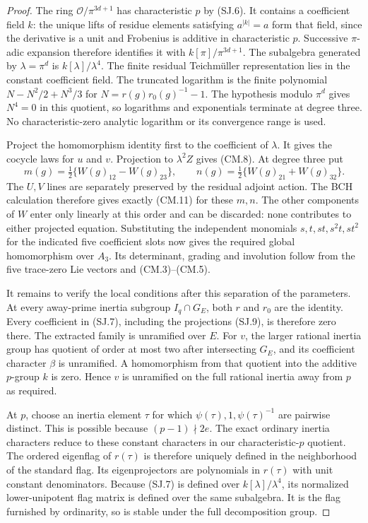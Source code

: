 \begin{proof}
The ring $\mathcal O/\pi^{3d+1}$ has characteristic $p$
by (SJ.6).  It contains a coefficient field $k$: the unique
lifts of residue elements satisfying $a^{|k|}=a$ form that
field, since the derivative is a unit and Frobenius is
additive in characteristic $p$.
Successive $\pi$-adic expansion therefore identifies it
with $k[\pi]/\pi^{3d+1}$.
The subalgebra generated by $\lambda=\pi^d$ is
$k[\lambda]/\lambda^4$.
The finite residual Teichm\"uller representation lies in
the constant coefficient field.
The truncated logarithm is the finite polynomial
$N-N^2/2+N^3/3$ for $N=r(g)r_0(g)^{-1}-1$.
The hypothesis modulo $\pi^d$ gives $N^4=0$ in this
quotient, so logarithms and exponentials terminate at
degree three.  No characteristic-zero analytic
logarithm or its convergence range is used.

Project the homomorphism identity first to the coefficient
of $\lambda$.  It gives the cocycle laws for $u$ and $v$.
Projection to $\lambda^2Z$ gives (CM.8).
At degree three put
\[
 m(g)=\tfrac12\{W(g)_{12}-W(g)_{23}\},\qquad
 n(g)=\tfrac12\{W(g)_{21}+W(g)_{32}\}.                  \tag{SJ.9}
\]
The $U,V$ lines are separately preserved by the residual
adjoint action.  The BCH calculation therefore gives
exactly (CM.11) for these $m,n$.
The other components of $W$ enter only linearly at this
order and can be discarded: none contributes to either
projected equation.  Substituting the independent monomials
$s,t,st,s^2t,st^2$ for the indicated five coefficient slots
now gives the required global homomorphism over $A_3$.
Its determinant, grading and involution follow from
the five trace-zero Lie vectors and (CM.3)--(CM.5).

It remains to verify the local conditions after this
separation of the parameters.
At every away-prime inertia subgroup $I_q\cap G_E$,
both $r$ and $r_0$ are the identity.  Every coefficient
in (SJ.7), including the projections (SJ.9), is therefore
zero there.  The extracted family is unramified over $E$.
For $v$, the larger rational inertia group has quotient
of order at most two after intersecting $G_E$, and its
coefficient character $\beta$ is unramified.
A homomorphism from that quotient into the additive
$p$-group $k$ is zero.  Hence $v$ is unramified on
the full rational inertia away from $p$ as required.

At $p$, choose an inertia element $\tau$ for which
$\psi(\tau),1,\psi(\tau)^{-1}$ are pairwise distinct.
This is possible because $(p-1)\nmid2e$.
The exact ordinary inertia characters reduce to these
constant characters in our characteristic-$p$ quotient.
The ordered eigenflag of $r(\tau)$ is therefore uniquely
defined in the neighborhood of the standard flag.
Its eigenprojectors are polynomials in $r(\tau)$ with
unit constant denominators.  Because (SJ.7) is defined
over $k[\lambda]/\lambda^4$, its normalized lower-unipotent
flag matrix is defined over the same subalgebra.
It is the flag furnished by ordinarity, so is stable
under the full decomposition group.


\end{proof}
